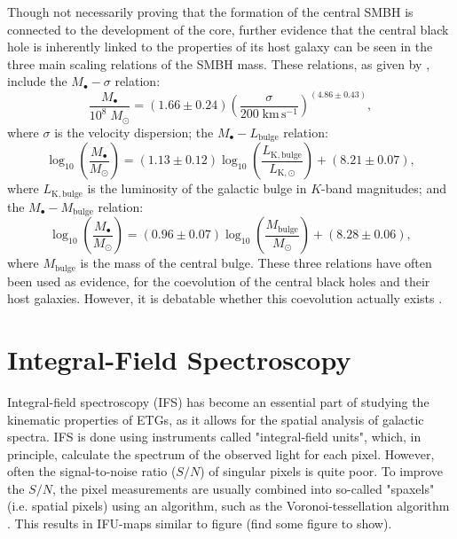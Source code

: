 \documentclass[english, oneside]{HYgradu}
\begin{document}
Though not necessarily proving that the formation of the central SMBH is connected to the development of the core, further evidence that the central black hole is inherently linked to the properties of its host galaxy can be seen in the three main scaling relations of the SMBH mass. These relations, as given by \cite{MerrittBook}, include the $M_\bullet - \sigma$ relation:
\begin{equation}
\frac{M_\bullet}{10^8 \; M_\odot} = (1.66 \pm 0.24) \left( \frac{\sigma}{200 \; \mathrm{km \, s^{-1}}} \right)^{(4.86\pm0.43)},
\end{equation}
where $\sigma$ is the velocity dispersion; the $M_\bullet - L_\mathrm{bulge}$ relation:
\begin{equation}
\log_{10} \left( \frac{M_\bullet}{M_\odot} \right) = (1.13 \pm 0.12) \log_{10} \left( \frac{L_\mathrm{K,bulge}}{L_\mathrm{K,\odot}} \right) + (8.21 \pm 0.07),
\end{equation}
where $L_\mathrm{K,bulge}$ is the luminosity of the galactic bulge in $K$-band magnitudes; and the $M_\bullet - M_\mathrm{bulge}$ relation:
\begin{equation}
\log_{10} \left( \frac{M_\bullet}{M_\odot} \right) = (0.96 \pm 0.07) \log_{10} \left( \frac{M_\mathrm{bulge}}{M_\odot} \right) + (8.28 \pm 0.06),
\end{equation}
where $M_\mathrm{bulge}$ is the mass of the central bulge. These three relations have often been used as evidence, for the coevolution of the central black holes and their host galaxies. However, it is debatable whether this coevolution actually exists \citep{Kormendy2013}.

\section{Integral-Field Spectroscopy}

Integral-field spectroscopy (IFS) has become an essential part of studying the kinematic properties of ETGs, as it allows for the spatial analysis of galactic spectra. IFS is done using instruments called "integral-field units", which, in principle, calculate the spectrum of the observed light for each pixel. However, often the signal-to-noise ratio ($S/N$) of singular pixels is quite poor. To improve the $S/N$, the pixel measurements are usually combined into so-called "spaxels" (i.e. spatial pixels) using an algorithm, such as the Voronoi-tessellation algorithm \citep{Cappellari2003}. This results in IFU-maps similar to figure (find some figure to show).
\end{document}
